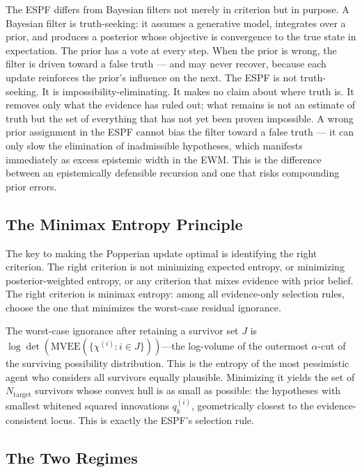 \documentclass[12pt]{article}
\begin{document}
The ESPF differs from Bayesian filters not merely in criterion but in purpose. A Bayesian
filter is truth-seeking: it assumes a generative model, integrates over a prior, and produces
a posterior whose objective is convergence to the true state in expectation. The prior has a
vote at every step. When the prior is wrong, the filter is driven toward a false truth --- and
may never recover, because each update reinforces the prior's influence on the next. The ESPF
is not truth-seeking. It is impossibility-eliminating. It makes no claim about where truth is.
It removes only what the evidence has ruled out; what remains is not an estimate of truth but
the set of everything that has not yet been proven impossible. A wrong prior assignment in the
ESPF cannot bias the filter toward a false truth --- it can only slow the elimination of
inadmissible hypotheses, which manifests immediately as excess epistemic width in the EWM.
This is the difference between an epistemically defensible recursion and one that risks
compounding prior errors.

\subsection{The Minimax Entropy Principle}

The key to making the Popperian update optimal is identifying the right criterion. The right
criterion is not minimizing expected entropy, or minimizing posterior-weighted entropy, or any
criterion that mixes evidence with prior belief. The right criterion is minimax entropy: among all
evidence-only selection rules, choose the one that minimizes the worst-case residual ignorance.

The worst-case ignorance after retaining a survivor set $J$ is $\log \det(\mathrm{MVEE}(\{\chi^{(i)} : i \in J\}))$---the
log-volume of the outermost $\alpha$-cut of the surviving possibility distribution. This is the entropy of
the most pessimistic agent who considers all survivors equally plausible. Minimizing it yields the set
of $N_{\mathrm{target}}$ survivors whose convex hull is as small as possible: the hypotheses with smallest whitened
squared innovations $q^{(i)}_k$, geometrically closest to the evidence-consistent locus. This is exactly the
ESPF's selection rule.

\subsection{The Two Regimes}
\end{document}
